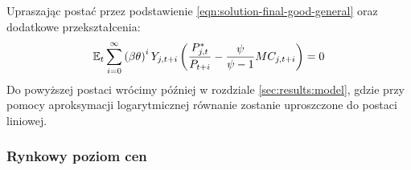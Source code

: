 Upraszając postać przez podstawienie \eqref{eqn:solution-final-good-general} oraz dodatkowe przekształcenia:
\begin{equation}
    \label{eq:price_level_final_company}
    \mathbb{E}_t \sum_{i=0}^{\infty}\left( \beta \theta \right)^i Y_{j,t+i} \left( \frac{P^*_{j,t}}{P_{t+i}} - \frac{\psi}{\psi - 1} MC_{j,t+i}\right) = 0
\end{equation}
Do powyższej postaci wrócimy później w rozdziale \ref{sec:results:model}, gdzie przy pomocy aproksymacji logarytmicznej równanie zostanie uproszczone do postaci liniowej.

\subsubsection{Rynkowy poziom cen}

